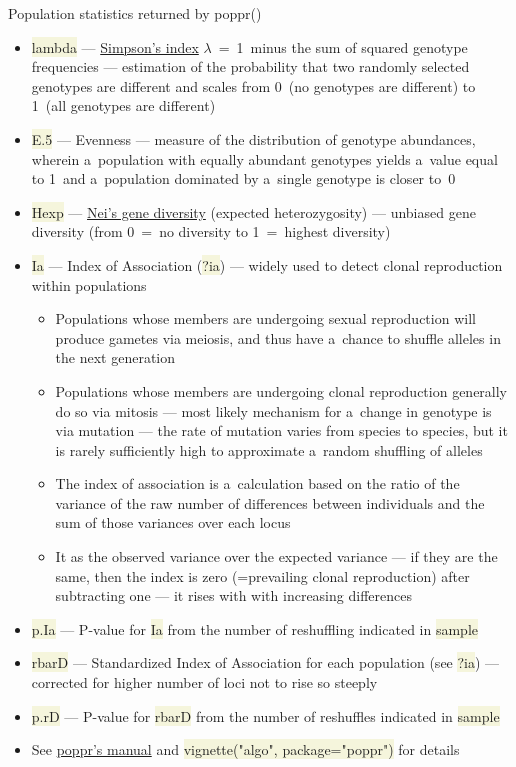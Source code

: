 \documentclass[compress, ucs, xelatex, 11pt, xcolor=svgnames, aspectratio=169,
	hyperref={
		bookmarks=true,
		unicode=true,
		colorlinks=true,
		pdftitle={Molecular data in R},
		plainpages=false,
		pdfauthor={Vojtech Zeisek},
		pdfsubject={Course about phylogeny and evolution in R},
		pdfcreator={XeLaTeX},
		pdfkeywords={R, evolution, phylogeny, molecular data},
		linkcolor=Crimson, %
		anchorcolor=Magenta, %
		citecolor=Magenta, %
		filecolor=Magenta, %
		menucolor=Magenta, %
		urlcolor=DodgerBlue, %
		pdftex},
	url={hyphens, lowtilde} %
	]{beamer}
\renewcommand{\texttt}[1]{\colorbox{Beige}{{\ttfamily #1}}}
\begin{document}
\begin{frame}[allowframebreaks]{Population statistics returned by poppr()}
\begin{itemize}
		\item \texttt{lambda} --- \href{https://en.wikipedia.org/wiki/Diversity_index\#Simpson_index}{Simpson's index} $\lambda$~=~1~minus the sum of squared genotype frequencies --- estimation of the probability that two randomly selected genotypes are different and scales from 0~(no genotypes are different) to 1~(all genotypes are different)
		\item \texttt{E.5} --- Evenness --- measure of the distribution of genotype abundances, wherein a~population with equally abundant genotypes yields a~value equal to 1~and a~population dominated by a~single genotype is closer to~0
		\item \texttt{Hexp} --- \href{http://www.genetics.org/content/89/3/583}{Nei's gene diversity} (expected heterozygosity) --- unbiased gene diversity (from 0~=~no diversity to 1~=~highest diversity)
		\item \texttt{Ia} --- Index of Association (\texttt{?ia}) --- widely used to detect clonal reproduction within populations
		\begin{itemize}
			\item Populations whose members are undergoing sexual reproduction will produce gametes via meiosis, and thus have a~chance to shuffle alleles in the next generation
			\item Populations whose members are undergoing clonal reproduction generally do so via mitosis --- most likely mechanism for a~change in genotype is via mutation --- the rate of mutation varies from species to species, but it is rarely sufficiently high to approximate a~random shuffling of alleles
			\item The index of association is a~calculation based on the ratio of the variance of the raw number of differences between individuals and the sum of those variances over each locus
			\item It as the observed variance over the expected variance --- if they are the same, then the index is zero (=prevailing clonal reproduction) after subtracting one --- it rises with with increasing differences
		\end{itemize}
		\item \texttt{p.Ia} --- P-value for \texttt{Ia} from the number of reshuffling indicated in \texttt{sample}
		\item \texttt{rbarD} --- Standardized Index of Association for each population (see \texttt{?ia}) --- corrected for higher number of loci not to rise so steeply
		\item \texttt{p.rD} --- P-value for \texttt{rbarD} from the number of reshuffles indicated in \texttt{sample}
		\item See \href{https://grunwaldlab.github.io/Population_Genetics_in_R/}{poppr's manual} and \texttt{vignette("algo", package="poppr")} for details
	\end{itemize}
\end{frame}
\end{document}
